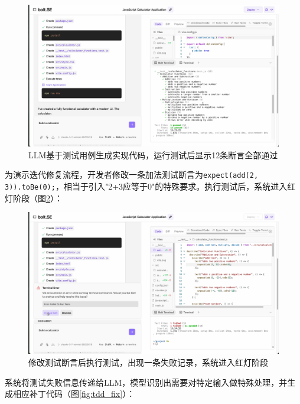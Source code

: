 \begin{figure}[H]
  \centering
  \includegraphics[width=.9\textwidth]{figures/screenshots/tdd/green_pass_initial.png}
  \caption{LLM基于测试用例生成实现代码，运行测试后显示12条断言全部通过}
  \label{fig:tdd_green_initial}
\end{figure}

为演示迭代修复流程，开发者修改一条加法测试断言为\verb|expect(add(2, 3)).toBe(0);|，相当于引入"2+3应等于0"的特殊要求。执行测试后，系统进入红灯阶段（图\ref{fig:tdd_red}）：

\begin{figure}[H]
  \centering
  \includegraphics[width=.9\textwidth]{figures/screenshots/tdd/test_edit_fail.png}
  \caption{修改测试断言后执行测试，出现一条失败记录，系统进入红灯阶段}
  \label{fig:tdd_red}
\end{figure}

系统将测试失败信息传递给LLM，模型识别出需要对特定输入做特殊处理，并生成相应补丁代码（图\ref{fig:tdd_fix}）：

